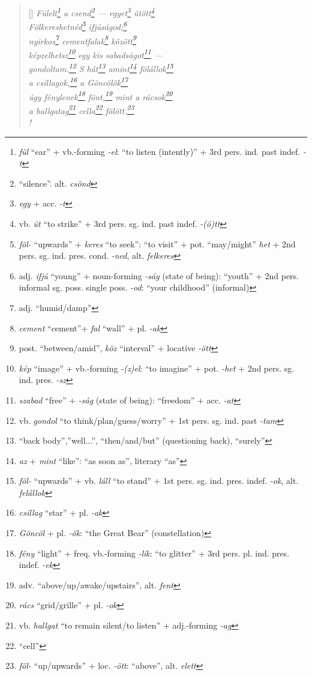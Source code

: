 \documentclass[a4paper,12pt,twoside,final]{book}
\begin{document}
\begin{verse}[\versewidth]
  \it
  Fülelt\footnote{\emph{fül} ``ear'' + vb.-forming \emph{-el}: ``to
  listen (intently)'' + 3rd pers. ind. past indef. \emph{-t}} a
  csend\footnote{``silence''. alt. \emph{csönd}}
  --- egyet\footnote{\emph{egy} + acc. \emph{-t}}
  ütött\footnote{vb. \emph{üt} ``to strike'' + 3rd
  pers. sg. ind. past indef. \emph{-(ö)tt}} \\
  Fölkereshetnéd\footnote{\emph{föl-}
  ``upwards'' + \emph{keres} ``to seek'': ``to visit'' +
  pot. ``may/might'' \emph{het} + 2nd
  pers. sg. ind. pres. cond. \emph{-ned}, alt. \emph{felkeres}}
  ifjúságod;\footnote{adj. \emph{ifjú} ``young'' + noun-forming
  \emph{-ság} (state of being): ``youth'' + 2nd pers. informal sg.
  poss. single poss. \emph{-od}: ``your childhood'' (informal)} \\
  nyirkos\footnote{adj. ``humid/damp''}
  cementfalak\footnote{\emph{cement} ``cement''+ \emph{fal} ``wall'' +
  pl. \emph{-ak}} között\footnote{post. ``between/amid'', \emph{köz}
  ``interval'' + locative \emph{-ött}} \\
  képzelhetsz\footnote{\emph{kép} ``image'' + vb.-forming
  \emph{-(z)el}: ``to imagine'' + pot. \emph{-het} + 2nd
  pers. sg. ind. pres. \emph{-sz}} egy kis
  sabadságot\footnote{\emph{szabad} ``free'' + \emph{-ság} (state of
  being): ``freedom'' + acc. \emph{-at}} --- \\
  gondoltam.\footnote{vb. \emph{gondol} ``to
  think/plan/guess/worry'' + 1st pers. sg. ind. past
  \emph{-tam}} S hát\footnote{``back body'',''well...'',
  ``then/and/but'' (questioning back), ``surely''}
  amint\footnote{\emph{az} + \emph{mint} ``like'': ``as soon as'',
  literary ``as''} fölállok\footnote{\emph{föl-}
  ``upwards'' +  vb. \emph{láll} ``to stand'' + 1st
  pers. sg. ind. pres. indef. \emph{-ok}, alt. \emph{felállok}} \\
  a csillagok,\footnote{\emph{csillag} ``star'' + pl. \emph{-ak}} a
  Göncölök\footnote{\emph{Göncöl} + pl. \emph{-ök}: ``the Great Bear''
  (constellation)} \\
  úgy fénylenek\footnote{\emph{fény} ``light'' + freq. vb.-forming
  \emph{-lik}: ``to glitter'' + 3rd
  pers. pl. ind. pres. indef. \emph{-ek}}
  fönt,\footnote{adv. ``above/up/awake/upstairs'', alt. \emph{fent}}
  mint a rácsok\footnote{\emph{rács} ``grid/grille'' + pl. \emph{-ok}} \\
  a hallgatag\footnote{vb. \emph{hallgat} ``to remain silent/to
  listen'' + adj.-forming \emph{-ag}} cella\footnote{``cell''}
  fölött.\footnote{\emph{föl-} ``up/upwards'' +  loc. \emph{-ött}:
  ``above'', alt. \emph{elett}} \\!
\end{verse}
\end{document}
